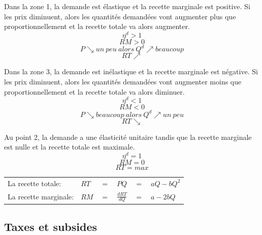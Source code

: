 \begin{minipage}{0.6\textwidth}
    Dans la zone 1, la demande est \textcolor[rgb]{1,0,0}{élastique} et la recette marginale est \textcolor[rgb]{1,0,0}{positive}.
		Si les prix diminuent, alors les quantités demandées vont \textcolor[rgb]{1,0,0}{augmenter plus} que proportionnellement et la recette totale va alors \textcolor[rgb]{1,0,0}{augmenter}.
		$$\eta^d > 1$$
		$$RM > 0$$
		$$P \searrow un\ peu\ alors\ Q^d \nearrow beaucoup$$
		$$RT \nearrow$$

		Dans la zone 3, la demande est \textcolor[rgb]{1,0,0}{inélastique} et la recette marginale est \textcolor[rgb]{1,0,0}{négative}.
		Si les prix diminuent, alors les quantités demandées vont \textcolor[rgb]{1,0,0}{augmenter} moins que proportionnellement et la recette totale va alors \textcolor[rgb]{1,0,0}{diminuer}.
		$$\eta^d < 1$$
		$$RM < 0$$
		$$P \searrow beaucoup\ alors\ Q^d \nearrow un\ peu$$
		$$RT \searrow$$

		Au point 2, la demande a une élasticité unitaire tandis que la recette marginale est nulle et la recette totale est maximale.
		$$\eta^d = 1$$
		$$RM = 0$$
		$$RT = max$$
    
    \begin{tabular}{llllll}
        La recette totale:    & $RT$ & $=$ & $PQ$ & $=$ & $aQ - bQ^2$\\
        La recette marginale: & $RM$ & $=$ & $\frac{dRT}{dQ}$ & $=$ & $a - 2bQ$\\
    \end{tabular}
\end{minipage}



\subsection{Taxes et subsides}



